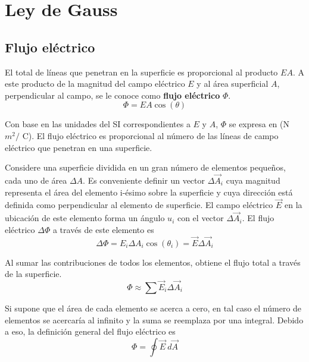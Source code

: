 \section{Ley de Gauss}
  \subsection{Flujo eléctrico}
    \PN El total de líneas que penetran en la superficie es proporcional al producto $EA$. A este producto de la
    magnitud del campo eléctrico $E$ y al área superficial $A$, perpendicular al campo, se le conoce como \textbf{flujo
    eléctrico} $\Phi$.
    \begin{equation*}
      \Phi = EA \cos(\theta)
    \end{equation*}

    \PN Con base en las unidades del SI correspondientes a $E$ y $A$, $\Phi$ se expresa en (N $m^{2} /$ C). El flujo
    eléctrico es proporcional al número de las líneas de campo eléctrico que penetran en una superficie.

    \PN Considere una superficie dividida en un gran número de elementos pequeños, cada uno de área $\Delta A$. Es
    conveniente definir un vector $\Delta \vec{A}_{i}$ cuya magnitud representa el área del elemento i-ésimo sobre la
    superficie y cuya dirección está definida como perpendicular al elemento de superficie. El campo eléctrico $\vec{E}$
    en la ubicación de este elemento forma un ángulo $u_{i}$ con el vector $\Delta \vec{A}_{i}$. El flujo eléctrico
    $\Delta \Phi$ a través de este elemento es
    \begin{equation*}
      \Delta \Phi = E_{i} \Delta A_{i} \cos(\theta_{i}) = \vec{E} \Delta \vec{A}_{i}
    \end{equation*}

    \PN Al sumar las contribuciones de todos los elementos, obtiene el flujo total a través de la superficie.
    \begin{equation*}
      \Phi \approx \sum \vec{E}_{i} \Delta \vec{A}_{i}
    \end{equation*}

    \PN Si supone que el área de cada elemento se acerca a cero, en tal caso el número de elementos se acercaría al
    infinito y la suma se reemplaza por una integral. Debido a eso, la definición general del flujo eléctrico es
    \begin{equation*}
      \Phi = \oint \vec{E} \ d\vec{A}
    \end{equation*}

